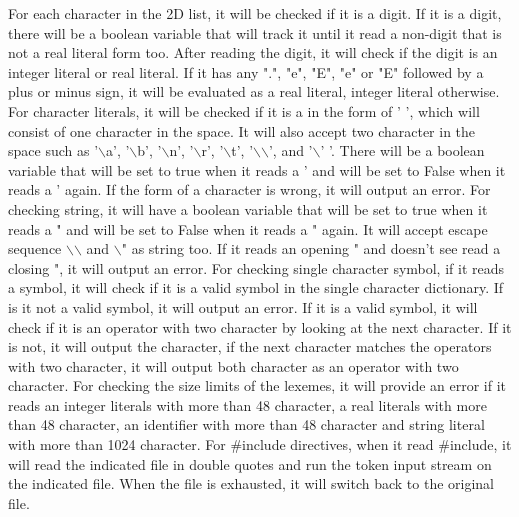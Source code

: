 \documentclass[11pt]{article}
\begin{document}
\newline
For each character in the 2D list, it will be checked if it is a digit. If it is a digit, there will be a boolean variable that will track it until it read a non-digit that is not a real literal form too. After reading the digit, it will check if the digit is an integer literal or real literal. If it has any ".", "e", "E", "e" or "E" followed by a plus or minus sign, it will be evaluated as a real literal, integer literal otherwise.\newline
\newline
For character literals, it will be checked if it is a in the form of ' ', which will consist of one character in the space. It will also accept two character in the space such as ’$\backslash$a’, ’$\backslash$b’, ’$\backslash$n’, ’$\backslash$r’, ’$\backslash$t’, ’$\backslash$$\backslash$’, and ’$\backslash$’ ’. There will be a boolean variable that will be set to true when it reads a ' and will be set to False when it reads a ' again. If the form of a character is wrong, it will output an error.\newline
\newline
For checking string, it will have a boolean variable that will be set to true when it reads a " and will be set to False when it reads a " again. It will accept escape sequence $\backslash$$\backslash$ and $\backslash$" as string too. If it reads an opening " and doesn't see read a closing ", it will output an error. \newline
\newline
For checking single character symbol, if it reads a symbol, it will check if it is a valid symbol in the single character dictionary. If is it not a valid symbol, it will output an error. If it is a valid symbol, it will check if it is an operator with two character by looking at the next character. If it is not, it will output the character, if the next character matches the operators with two character, it will output both character as an operator with two character. \newline
\newline
For checking the size limits of the lexemes, it will provide an error if it reads an integer literals with more than 48 character, a real literals with more than 48 character, an identifier with more than 48 character and string literal with more than 1024 character. \newline
\newline
For $\#$include directives, when it read $\#$include, it will read the indicated file in double quotes and run the token input stream on the indicated file. When the file is exhausted, it will switch back to the original file. \newline
\end{document}
